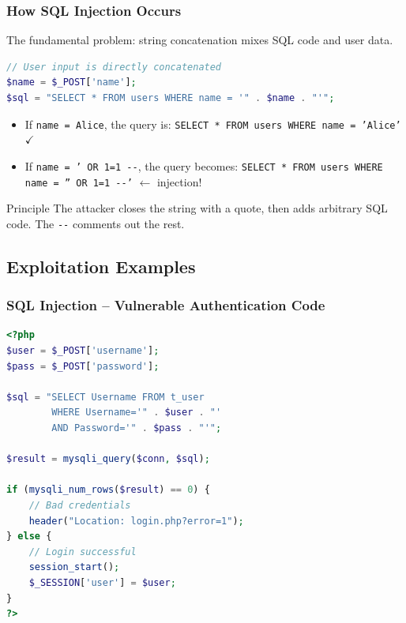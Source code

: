 \documentclass{beamer}
\def\emptyline{\vspace{10pt}}
\begin{document}
\begin{frame}[fragile]
\frametitle{How SQL Injection Occurs}

The fundamental problem: \alert{string concatenation} mixes SQL code and user data.

\begin{lstlisting}[language=PHP,title={\texttt{Dangerous query construction}}]
// User input is directly concatenated
$name = $_POST['name'];
$sql = "SELECT * FROM users WHERE name = '" . $name . "'";
\end{lstlisting}

\begin{itemize}
\item If \texttt{name = Alice}, the query is: \texttt{SELECT * FROM users WHERE name = 'Alice'} $\checkmark$
\item If \texttt{name = ' OR 1=1 -{}-}, the query becomes: \texttt{SELECT * FROM users WHERE name = '' OR 1=1 -{}-'} $\leftarrow$ \alert{injection!}
\end{itemize}

\emptyline
\begin{alertblock}{Principle}
The attacker \alert{closes the string} with a quote, then adds arbitrary SQL code. The \texttt{-{}-} comments out the rest.
\end{alertblock}
\end{frame}


\subsection{Exploitation Examples}

\begin{frame}[fragile]
\frametitle{SQL Injection -- Vulnerable Authentication Code}

\begin{lstlisting}[language=PHP,title={\texttt{login.php -- Vulnerable authentication}}]
<?php
$user = $_POST['username'];
$pass = $_POST['password'];

$sql = "SELECT Username FROM t_user
        WHERE Username='" . $user . "'
        AND Password='" . $pass . "'";

$result = mysqli_query($conn, $sql);

if (mysqli_num_rows($result) == 0) {
    // Bad credentials
    header("Location: login.php?error=1");
} else {
    // Login successful
    session_start();
    $_SESSION['user'] = $user;
}
?>
\end{lstlisting}
\end{frame}
\end{document}
